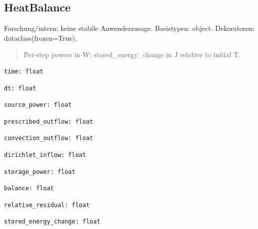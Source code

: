 \subsection{HeatBalance}
Forschung/intern; keine stabile Anwenderzusage.
Basistypen: object. Dekoratoren: dataclass(frozen=True).
\begin{quote}
Per-step powers in W; stored\_energy\_change in J relative to initial T.
\end{quote}
\begin{lstlisting}
time: float
\end{lstlisting}
\begin{lstlisting}
dt: float
\end{lstlisting}
\begin{lstlisting}
source_power: float
\end{lstlisting}
\begin{lstlisting}
prescribed_outflow: float
\end{lstlisting}
\begin{lstlisting}
convection_outflow: float
\end{lstlisting}
\begin{lstlisting}
dirichlet_inflow: float
\end{lstlisting}
\begin{lstlisting}
storage_power: float
\end{lstlisting}
\begin{lstlisting}
balance: float
\end{lstlisting}
\begin{lstlisting}
relative_residual: float
\end{lstlisting}
\begin{lstlisting}
stored_energy_change: float
\end{lstlisting}
